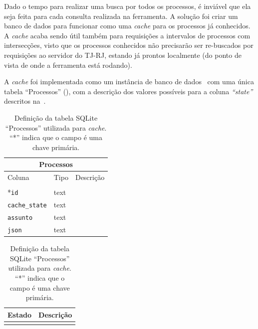 Dado o tempo para realizar uma busca por todos os processos, é inviável que ela
seja feita para cada consulta realizada na ferramenta. A solução foi criar um
banco de dados para funcionar como uma \textit{cache} para os processos já
conhecidos. A \textit{cache} acaba sendo útil também para requisições a
intervalos de processos com intersecções, visto que os processos conhecidos não
precisarão ser re-buscados por requisições ao servidor do TJ-RJ, estando já
prontos localmente (do ponto de vista de onde a ferramenta está rodando).

A \textit{cache} foi implementada como um instância de banco de
dados~\cite{tool:sqlite} com uma única tabela ``Processos''
(), com a descrição dos valores possíveis
para a coluna \textit{``state''} descritos na~.

\begin{table}[htb]
    \centering
    \begin{tabular}{lll}
        \toprule
        \multicolumn{3}{c}{Processos} \\
        \midrule
        Coluna & Tipo & Descrição \\
        \midrule \\
        *\texttt{id} & text & \\
        \texttt{cache\_state} & text & \\
        \texttt{assunto} & text & \\
        \texttt{json} & text & \\
        \bottomrule
    \end{tabular}
    \caption{%
        Definição da tabela SQLite ``Processos'' utilizada para \textit{cache}.
        ``*'' indica que o campo é uma chave primária.
    }
    \label{tbl:estrutura-tabela-processos}
\end{table}

\begin{table}[htb]
    \centering
    \begin{tabular}{ll}
        \toprule
        Estado & Descrição \\
        \midrule \\
        \bottomrule
    \end{tabular}
    \caption{%
        Definição da tabela SQLite ``Processos'' utilizada para \textit{cache}.
        ``*'' indica que o campo é uma chave primária.
    }
    \label{tbl:estrutura-tabela-processos}
\end{table}
